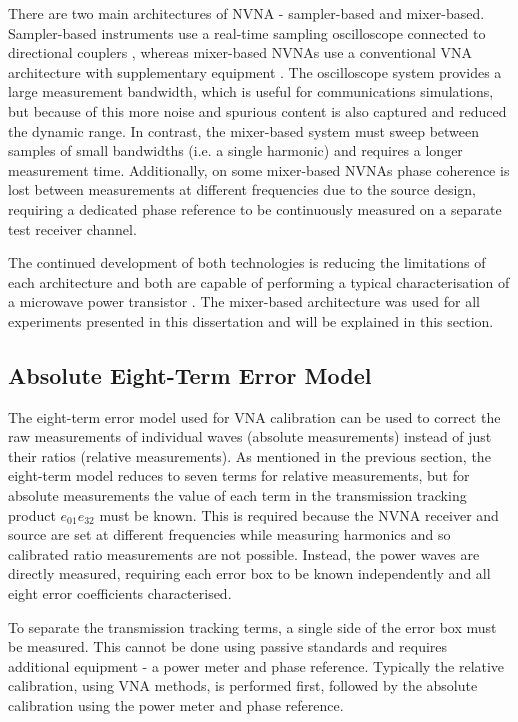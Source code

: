 \documentclass[../thesis/thesis.tex]{subfiles}
\begin{document}
There are two main architectures of NVNA - sampler-based and mixer-based. Sampler-based instruments use a real-time sampling oscilloscope connected to directional couplers \cite{Sipila_1988, Broeck_1994, Scott_2002, VanMoer_2006}, whereas mixer-based NVNAs use a conventional VNA architecture with supplementary equipment \cite{Lott_1989, Blockley_2005}. The oscilloscope system provides a large measurement bandwidth, which is useful for communications simulations, but because of this more noise and spurious content is also captured and reduced the dynamic range. In contrast, the mixer-based system must sweep between samples of small bandwidths (i.e. a single harmonic) and requires a longer measurement time. Additionally, on some mixer-based NVNAs phase coherence is lost between measurements at different frequencies due to the source design, requiring a dedicated phase reference to be continuously measured on a separate test receiver channel.

The continued development of both technologies is reducing the limitations of each architecture and both are capable of performing a typical characterisation of a microwave power transistor \cite{Casbon_2015}. The mixer-based architecture was used for all experiments presented in this dissertation and will be explained in this section.

\subsection{Absolute Eight-Term Error Model}

The eight-term error model used for VNA calibration can be used to correct the raw measurements of individual waves (absolute measurements) instead of just their ratios (relative measurements). As mentioned in the previous section, the eight-term model reduces to seven terms for relative measurements, but for absolute measurements the value of each term in the transmission tracking product $e_{01}e_{32}$ must be known. This is required because the NVNA receiver and source are set at different frequencies while measuring harmonics and so calibrated ratio measurements are not possible. Instead, the power waves are directly measured, requiring each error box to be known independently and all eight error coefficients characterised.

To separate the transmission tracking terms, a single side of the error box must be measured. This cannot be done using passive standards and requires additional equipment - a power meter and phase reference. Typically the relative calibration, using VNA methods, is performed first, followed by the absolute calibration using the power meter and phase reference.
\end{document}
